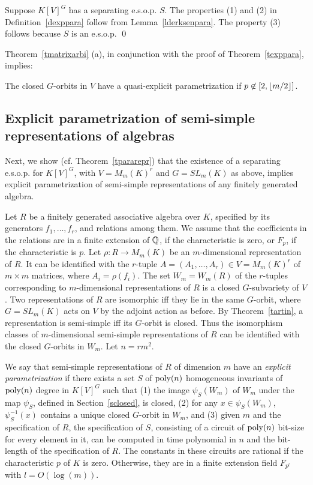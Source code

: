 \documentclass[11pt]{article}
\begin{document}
Suppose $K[V]^G$ has a separating e.s.o.p. $S$. The properties (1) and (2) in Definition~\ref{dexppara} 
follow from Lemma~\ref{lderksenpara}. The  property (3) follows because $S$ is an e.s.o.p. 
\qed

Theorem~\ref{tmatrixarbi} (a), in conjunction with the proof of Theorem~\ref{texppara},  implies:



\begin{theorem} \label{tquasiexplicitorbits}
The closed $G$-orbits in $V$ have a quasi-explicit parametrization if $p \not \in [2,{\lfloor m/2 \rfloor}]$.
\end{theorem}

\subsection{Explicit  parametrization of semi-simple representations of algebras} 
\label{ssemisimple}
Next, we show (cf. Theorem~\ref{tpararepr}) that the existence of a separating e.s.o.p. for $K[V]^G$,
with $V=M_{m}(K)^r$ and $G=SL_m(K)$   as above, 
 implies explicit parametrization of semi-simple representations of any finitely generated algebra.

Let $R$ be a finitely generated  associative algebra over $K$, specified by its generators   $f_1,\ldots,f_r$, and relations 
among them. We assume that the coefficients in the relations are in a finite extension of
$\mathbb{Q}$, if the characteristic is zero, or $F_p$, if the characteristic is $p$.
Let $\rho: R \rightarrow M_m(K)$ be an  $m$-dimensional representation of $R$. 
It can be identified 
with the  $r$-tuple $A=(A_1,\ldots, A_r)\in V = M_m(K)^r$ of $m\times m$ matrices, where $A_i=\rho(f_i)$. 
The set  $W_m=W_m(R)$ of the $r$-tuples corresponding to $m$-dimensional representations 
of $R$ is a closed $G$-subvariety of $V$. 
Two representations of $R$ are isomorphic iff they
lie in the same $G$-orbit, where $G=SL_m(K)$ acts on $V$ by the adjoint action as before. 
By Theorem~\ref{tartin}, a representation is semi-simple iff its $G$-orbit
is closed.
Thus the isomorphism classes of $m$-dimensional semi-simple representations of $R$
can be identified with the closed $G$-orbits in $W_m$. Let $n=r m^2$.

We say that semi-simple representations of $R$ of dimension $m$
have an {\em explicit parametrization} if 
there exists a set $S$ of ${\mbox {poly}}(n)$ homogeneous invariants of ${\mbox {poly}}(n)$ degree
in $K[V]^G$ such that 
(1) the image $\psi_S(W_m)$ of $W_m$ under the map $\psi_S$, defined in  Section~\ref{sclosed},  is closed,
(2)  for any $x \in \psi_S(W_m)$, $\psi_S^{-1}(x)$ contains a unique closed $G$-orbit in $W_m$, and
(3) given $m$ and the specification of $R$, the specification of $S$, consisting of a circuit of ${\mbox {poly}}(n)$  bit-size for every 
element in it, can be computed in  time polynomial in $n$ and the bit-length of the specification
of $R$. The constants in these circuits are rational if the
characteristic $p$ of $K$ is zero. Otherwise, they are in a finite  extension field $F_{p^l}$ with $l=O(\log(m))$.
\end{document}
